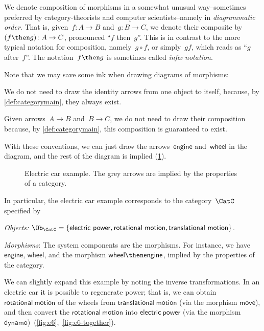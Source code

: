 \begin{remark}
We denote composition of morphisms in a somewhat unusual way--sometimes preferred by category-theorists and computer scientists--namely in \emph{diagrammatic order}. That is, given~$f\colon A\to B$ and~$g\colon B\to C$, we denote their composite by~$(f\then g)\colon A\to C$, pronounced ``$f$ then~$g$''. This is in contrast to the more typical notation for composition, namely~$g\circ f$, or simply~$gf$, which reads as ``$g$ after~$f$''. The notation~$f\then g$ is sometimes called \emph{infix notation}.
\end{remark}

Note that we may save some ink when drawing diagrams of morphisms:
\begin{compactitem}
\item We do not need to draw the identity arrows from one object to itself, because, by \cref{def:categorymain}, they always exist.
\item  Given arrows~$A\to B$ and~$B \to C$, we do not need to draw their composition because, by \cref{def:categorymain}, this composition is guaranteed to exist.
\end{compactitem}

With these conventions, we can just draw the arrows~$\mathsf{engine}$ and~$\mathsf{wheel}$ in the diagram, and the rest of the diagram is implied (\cref{fig:e5}).

\begin{figure}[h!]
    \centering
    \caption{Electric car example. The grey arrows are implied by the properties
    of a category.\label{fig:e5} }
\end{figure}

In particular, the electric car example corresponds to the category~$\CatC$ specified by
\begin{compactitem}
    \item \emph{Objects:} $\Ob_\CatC=\{\mathsf{electric}\ \mathsf{power},\mathsf{rotational}\ \mathsf{motion},\mathsf{translational}\ \mathsf{motion}\}$.
    \item \emph{Morphisms}: The system components are the morphisms. For instance, we have $\mathsf{engine}$, $\mathsf{wheel}$, and the morphism $\mathsf{wheel \then engine}$, implied by the properties of the category.
\end{compactitem}

We can slightly expand this example by noting the inverse transformations. In an electric car
it is possible to regenerate power; that is, we can obtain $\mathsf{rotational}\ \mathsf{motion}$ of the wheels from
$\mathsf{translational}\ \mathsf{motion}$ (via the morphism $\mathsf{move}$), and then convert the $\mathsf{rotational}\ \mathsf{motion}$ into $\mathsf{electric}\ \mathsf{power}$ (via the morphism $\mathsf{dynamo}$)~(\cref{fig:e6},~\cref{fig:e6-together}).

